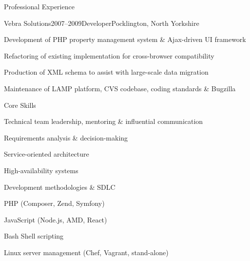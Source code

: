 \documentclass{cv}
\begin{document}
\begin{rSection}{Professional Experience}
\begin{rSubsection}{Vebra Solutions}{2007--2009}{Developer}{Pocklington, North Yorkshire}
\item Development of PHP property management system \& Ajax-driven UI framework
\item Refactoring of existing implementation for cross-browser compatibility
\item Production of XML schema to assist with large-scale data migration
\item Maintenance of LAMP platform, CVS codebase, coding standards \& Bugzilla
\end{rSubsection}

\end{rSection}


\begin{rSection}{Core Skills}

\begin{rSubsection}{}{}{}{}
\item Technical team leadership, mentoring \& influential communication
\item Requirements analysis \& decision-making
\item Service-oriented architecture
\item High-availability systems
\item Development methodologies \& SDLC
\item PHP (Composer, Zend, Symfony)
\item JavaScript (Node.js, AMD, React)
\item Bash Shell scripting
\item Linux server management (Chef, Vagrant, stand-alone)
\end{rSubsection}

\end{rSection}

\end{document}
